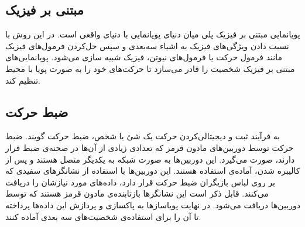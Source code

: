 \subsection{مبتنی بر فیزیک}

پویانمایی مبتنی بر فیزیک پلی میان دنیای پویانمایی با 
دنیای واقعی است. در این روش با نسبت دادن ویژگی‌های فیزیک به اشیاء سه‌بعدی و سپس حل‌کردن
فرمول‌های فیزیک مانند فرمول حرکت یا فرمول‌های نیوتن،
فیزیک شبیه سازی می‌شود.
پویانمایی‌های مبتنی بر فیزیک شخصیت را قادر می‌سازد تا حرکت‌های خود را 
به صورت پویا با محیط تنظیم کند.

\subsection{ضبط حرکت
\protect {}}

به فرآیند ثبت و دیجیتالی‌کردن حرکت یک شئ یا شخص، ضبط حرکت گویند.
ضبط حرکت توسط دوربین‌های مادون قرمز که تعدادی زیادی از آن‌ها در صحنه‌ی ضبط قرار دارند، صورت می‌گیرد.
این دوربین‌ها به صورت شبکه به یکدیگر متصل هستند و پس از کالیبره شدن، آماده‌ی استفاده هستند.
این دوربین‌ها با استفاده از نشانگر‌های سفیدی که بر روی لباس بازیگران 
ضبط حرکت قرار دارد، داده‌های مورد نیازشان را دریافت می‌کنند.
قابل ذکر است این نشانگر‌ها بازتابنده‌ی مادون قرمز هستند که توسط دوربین‌ها دریافت می‌شود.
در نهایت پویاسازها به پاکسازی و پردازش این داده‌ها پرداخته تا آن را 
برای استفاده‌ی شخصیت‌های سه بعدی آماده کنند.


